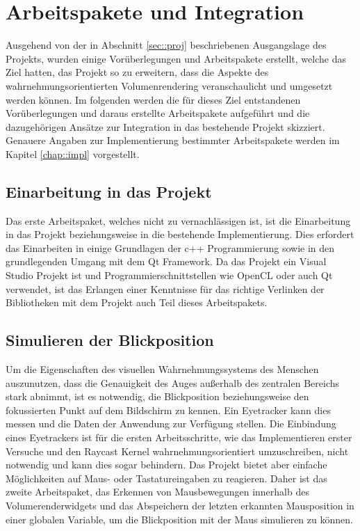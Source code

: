 \section{Arbeitspakete und Integration}\label{sec::workpacks}
Ausgehend von der in Abschnitt \ref{sec::proj} beschriebenen Ausgangslage des Projekts, wurden einige Vorüberlegungen und Arbeitspakete erstellt, welche das Ziel hatten, das Projekt so zu erweitern, dass die Aspekte des wahrnehmungsorientierten Volumenrendering veranschaulicht und umgesetzt werden können.
Im folgenden werden die für dieses Ziel entstandenen Vorüberlegungen und daraus erstellte Arbeitspakete aufgeführt und die dazugehörigen Ansätze zur Integration in das bestehende Projekt skizziert.
Genauere Angaben zur Implementierung bestimmter Arbeitspakete werden im Kapitel \ref{chap::impl} vorgestellt.

\subsection{Einarbeitung in das Projekt}\label{sec::workpacks::eidp}
Das erste Arbeitspaket, welches nicht zu vernachlässigen ist, ist die Einarbeitung in das Projekt beziehungsweise in die bestehende Implementierung.
Dies erfordert das Einarbeiten in einige Grundlagen der c++ Programmierung sowie in den grundlegenden Umgang mit dem Qt Framework.
Da das Projekt ein Visual Studio Projekt ist und Programmierschnittstellen wie OpenCL oder auch Qt verwendet, ist das Erlangen einer Kenntnisse für das richtige Verlinken der Bibliotheken mit dem Projekt auch Teil dieses Arbeitspakets.

\subsection{Simulieren der Blickposition}\label{sec::workpacks::sdb}
Um die Eigenschaften des visuellen Wahrnehmungssystems des Menschen auszunutzen, dass die Genauigkeit des Auges außerhalb des zentralen Bereichs stark abnimmt, ist es notwendig, die Blickposition beziehungsweise den fokussierten Punkt auf dem Bildschirm zu kennen.
Ein Eyetracker kann dies messen und die Daten der Anwendung zur Verfügung stellen.
Die Einbindung eines Eyetrackers ist für die ersten Arbeitsschritte, wie das Implementieren erster Versuche und den Raycast Kernel wahrnehmungsorientiert umzuschreiben, nicht notwendig und kann dies sogar behindern.
Das Projekt bietet aber einfache Möglichkeiten auf Maus- oder Tastatureingaben zu reagieren.
Daher ist das zweite Arbeitspaket, das Erkennen von Mausbewegungen innerhalb des Volumerenderwidgets und das Abspeichern der letzten erkannten Mausposition in einer globalen Variable, um die Blickposition mit der Maus simulieren zu können.

